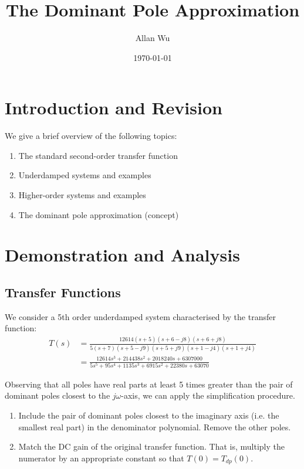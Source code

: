 \documentclass[12pt]{article}
\title{The Dominant Pole Approximation}
\author{Allan Wu}
\date{\today}
\begin{document}
\maketitle{}

\section*{Introduction and Revision}

We give a brief overview of the following topics:
\begin{enumerate}
\item The standard second-order transfer function
\item Underdamped systems and examples
\item Higher-order systems and examples
\item The dominant pole approximation (concept)
\end{enumerate}

\section*{Demonstration and Analysis}

\subsection*{Transfer Functions}

We consider a 5th order underdamped system characterised by the transfer function:
\begin{align*}
T(s) &= \frac{12614(s+5)(s+6-j8)(s+6+j8)}{5(s+7)(s+5-j9)(s+5+j9)(s+1-j4)(s+1+j4)} \\
&= \frac{12614 s^3 + 214438 s^2 + 2018240 s + 6307000}{5 s^5 + 95 s^4 + 1135 s^3 + 6915 s^2 + 22380 s + 63070}
\end{align*}

Observing that all poles have real parts at least 5 times greater than the pair of dominant poles closest to the $j\omega$-axis, we can apply the simplification procedure.
\begin{enumerate}
\item Include the pair of dominant poles closest to the imaginary axis (i.e. the smallest real part) in the denominator polynomial. Remove the other poles.
\item Match the DC gain of the original transfer function. That is, multiply the numerator by an appropriate constant so that $T\left(0\right)=T_{dp}\left(0\right).$
\end{enumerate}
\end{document}
